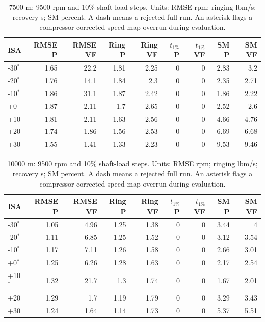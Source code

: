 \documentclass[11pt,a4paper]{article}
\begin{document}
\begin{table}[H]\centering\small
\setlength{\tabcolsep}{5pt}
\begin{tabular}{@{}lrrrrrrrr@{}}\toprule
ISA & RMSE P & RMSE VF & Ring P & Ring VF & $t_{1\%}$ P & $t_{1\%}$ VF & SM P & SM VF\\\midrule
-30$^*$ & 1.65 & 22.2 & 1.81 & 2.25 & 0 & 0 & 2.83 & 3.2\\
-20$^*$ & 1.76 & 14.1 & 1.84 & 2.3 & 0 & 0 & 2.35 & 2.71\\
-10$^*$ & 1.86 & 31.1 & 1.87 & 2.42 & 0 & 0 & 1.86 & 2.22\\
+0 & 1.87 & 2.11 & 1.7 & 2.65 & 0 & 0 & 2.52 & 2.6\\
+10 & 1.81 & 2.11 & 1.63 & 2.56 & 0 & 0 & 4.66 & 4.76\\
+20 & 1.74 & 1.86 & 1.56 & 2.53 & 0 & 0 & 6.69 & 6.68\\
+30 & 1.55 & 1.41 & 1.33 & 2.23 & 0 & 0 & 9.53 & 9.46\\
\bottomrule\end{tabular}\caption{7500 m: 9500 rpm and 10\% shaft-load steps. Units: RMSE rpm; ringing lbm/s; recovery s; SM percent. A dash means a rejected full run. An asterisk flags a compressor corrected-speed map overrun during evaluation.}\end{table}

\begin{table}[H]\centering\small
\setlength{\tabcolsep}{5pt}
\begin{tabular}{@{}lrrrrrrrr@{}}\toprule
ISA & RMSE P & RMSE VF & Ring P & Ring VF & $t_{1\%}$ P & $t_{1\%}$ VF & SM P & SM VF\\\midrule
-30$^*$ & 1.05 & 4.96 & 1.25 & 1.38 & 0 & 0 & 3.44 & 4\\
-20$^*$ & 1.11 & 6.85 & 1.25 & 1.52 & 0 & 0 & 3.12 & 3.54\\
-10$^*$ & 1.17 & 7.11 & 1.26 & 1.58 & 0 & 0 & 2.66 & 3.01\\
+0$^*$ & 1.25 & 6.26 & 1.28 & 1.63 & 0 & 0 & 2.17 & 2.54\\
+10$^*$ & 1.32 & 21.7 & 1.3 & 1.74 & 0 & 0 & 1.67 & 2.01\\
+20 & 1.29 & 1.7 & 1.19 & 1.79 & 0 & 0 & 3.29 & 3.43\\
+30 & 1.24 & 1.64 & 1.14 & 1.73 & 0 & 0 & 5.37 & 5.51\\
\bottomrule\end{tabular}\caption{10000 m: 9500 rpm and 10\% shaft-load steps. Units: RMSE rpm; ringing lbm/s; recovery s; SM percent. A dash means a rejected full run. An asterisk flags a compressor corrected-speed map overrun during evaluation.}\end{table}
\end{document}

